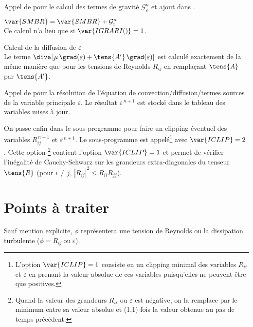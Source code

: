 \begin{itemize}
{\item Appel de  pour le calcul des termes de gravit\'e $\mathcal{G}^n_{\varepsilon}$ et ajout dans .

$ \var{SMBR} = \var{SMBR} + \mathcal{G}^n_{\varepsilon}$\\
Ce calcul n'a lieu que si $\var{IGRARI()} = 1$.

\item Calcul de la diffusion de $\varepsilon$ \\
 Le terme $\dive \left[\mu\, \grad(\varepsilon) + \tens{A'}\,\grad(\varepsilon)
\right]$ est calcul\'e exactement de la m\^eme mani\`ere que pour les tensions
de Reynolds $R_{ij}$ en rempla\c cant $\tens{A}$ par $\tens{A'}$.

\item Appel de  pour la r\'esolution de l'\'equation de
convection/diffusion/termes sources de la variable principale $\varepsilon$. Le
r\'esultat $\varepsilon^{\,n+1}$ est stock\'e dans le tableau  des
variables mises \`a jour.
}
\end{itemize}

On passe enfin dans le sous-programme   pour faire un clipping \'eventuel
des variables $R^{\,n+1}_{ij}$ et $\varepsilon^{\,n+1}$. Le sous-programme
 est appel\'e\footnote{L'option
$\var{ICLIP} = 1$ consiste en un clipping minimal des variables $R_{ii}$ et
$\varepsilon$ en prenant la valeur absolue de ces variables puisqu'elles ne
peuvent \^etre que positives.} avec $\var{ICLIP} = 2$ . Cette option
\footnote{Quand la valeur des grandeurs $R_{ii}$ ou $\varepsilon$ est
n\'egative, on la remplace par le minimum entre sa valeur absolue et (1,1)
fois la valeur obtenue au pas de temps pr\'ec\'edent.} contient l'option $\var{ICLIP} = 1$  et permet de v\'erifier l'in\'egalit\'e de Cauchy-Schwarz sur les grandeurs extra-diagonales du tenseur $\tens{R}$ (pour $i \neq j$, $|R_{ij}|^2 \le R_{ii} R_{jj}$).


\section*{Points \`a traiter}
Sauf mention explicite, $\phi$ repr\'esentera une tension de Reynolds ou la dissipation turbulente ($\phi = R_{ij} \ \text{ou} \ \varepsilon$).

